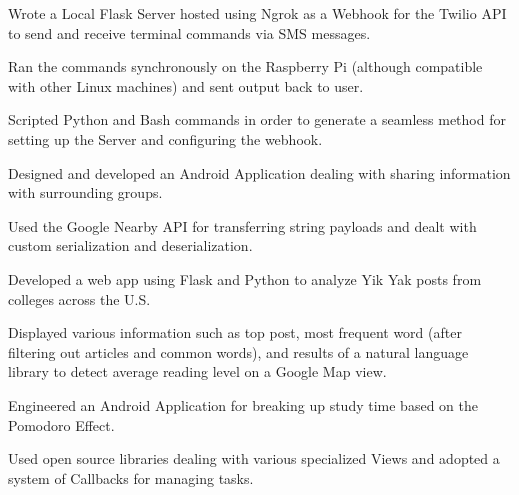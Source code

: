 \documentclass[]{format}
\begin{document}
\begin{minipage}[t]{0.66\textwidth}
\begin{tightemize}
\item Wrote a Local Flask Server hosted using Ngrok as a Webhook for the Twilio API to send and receive terminal commands via SMS messages.
\item Ran the commands synchronously on the Raspberry Pi (although compatible with other Linux machines) and sent output back to user.
\item Scripted Python and Bash commands in order to generate a seamless method for setting up the Server and configuring the webhook.
\end{tightemize}
\sectionsep

\begin{tightemize}
\item Designed and developed an Android Application dealing with sharing information with surrounding groups. 
\item Used the Google Nearby API for transferring string payloads and dealt with custom serialization and deserialization.
\end{tightemize}
\sectionsep

\begin{tightemize}
\item Developed a web app using Flask and Python to analyze Yik Yak posts from colleges across the U.S.
\item Displayed various information such as top post, most frequent word (after filtering out articles and common words),
and results of a natural language library to detect average reading level on a Google Map view.
\end{tightemize}
\sectionsep

\begin{tightemize}
\item Engineered an Android Application for breaking up study time based on the Pomodoro Effect.
\item Used open source libraries dealing with various specialized Views and adopted a system of Callbacks for managing tasks.
\end{tightemize}
\end{minipage} 
\end{document}
